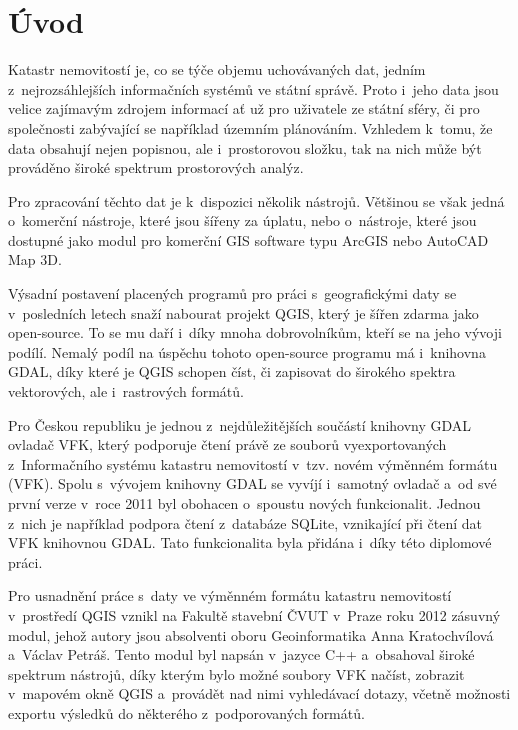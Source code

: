 \documentclass[a4paper,12pt,oneside]{book}
\begin{document}
\chapter*{Úvod}

Katastr nemovitostí je, co se týče objemu uchovávaných dat, jedním
z~nejrozsáhlejších informačních systémů ve státní správě. Proto i~jeho
data jsou velice zajímavým zdrojem informací ať už pro uživatele ze
státní sféry, či pro společnosti zabývající se například územním
plánováním. Vzhledem k~tomu, že data obsahují nejen popisnou, ale
i~prostorovou složku, tak na nich může být prováděno široké spektrum
prostorových analýz.

Pro zpracování těchto dat je k~dispozici několik nástrojů. Většinou se
však jedná o~komerční nástroje, které jsou šířeny za úplatu, nebo
o~nástroje, které jsou dostupné jako modul pro komerční GIS software
typu ArcGIS nebo AutoCAD Map 3D.

Výsadní postavení placených programů pro práci s~geografickými daty se
v~posledních letech snaží nabourat projekt QGIS, který je šířen zdarma
jako open-source. To se mu daří i~díky mnoha dobrovolníkům,
kteří se na jeho vývoji podílí. Nemalý podíl na úspěchu tohoto
open-source programu má i~knihovna GDAL, díky které je QGIS schopen
číst, či zapisovat do širokého spektra vektorových, ale i~rastrových
formátů.

Pro Českou republiku je jednou z~nejdůležitějších součástí knihovny
GDAL ovladač VFK, který podporuje čtení právě ze souborů
vyexportovaných z~Informačního systému katastru nemovitostí
v~tzv. novém výměnném formátu (VFK). Spolu s~vývojem knihovny GDAL se
vyvíjí i~samotný ovladač a~od své první verze v~roce 2011 byl obohacen
o~spoustu nových funkcionalit. Jednou z~nich je například podpora
čtení z~databáze SQLite, vznikající při čtení dat VFK knihovnou
GDAL. Tato funkcionalita byla přidána i~díky této diplomové práci.

Pro usnadnění práce s~daty ve výměnném formátu katastru nemovitostí
v~prostředí QGIS vznikl na Fakultě stavební ČVUT v~Praze roku 2012
zásuvný modul, jehož autory jsou absolventi oboru
Geoinformatika Anna Kratochvílová a~Václav Petráš. Tento modul byl
napsán v~jazyce C++ a~obsahoval široké spektrum nástrojů, díky kterým
bylo možné soubory VFK načíst, zobrazit v~mapovém okně QGIS a~provádět
nad nimi vyhledávací dotazy, včetně možnosti exportu výsledků do
některého z~podporovaných formátů.
\end{document}
